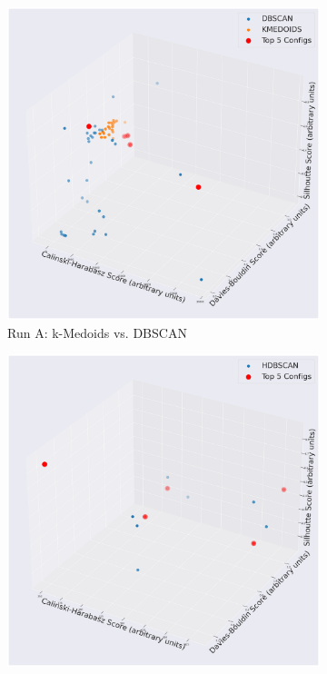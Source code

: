 \documentclass[10pt,oneside]{report}
\begin{document}
\begin{figure}[H]
    \centering
    \begin{subfigure}[b]{0.48\textwidth}
        \centering
        \includegraphics[width=\textwidth]{./images/mpnet_kmedoidsvsdbscan.png}
        \caption{Run A: k-Medoids vs. DBSCAN}
        \label{fig:mpnet_kmedoids_vs_dbscan_h2h_config} %
    \end{subfigure}
    \hfill
    \begin{subfigure}[b]{0.48\textwidth}
        \centering
        \includegraphics[width=\textwidth]{./images/mpnet_kmedoidsvshdbscan.png}

\end{subfigure}
\end{figure}
\end{document}
